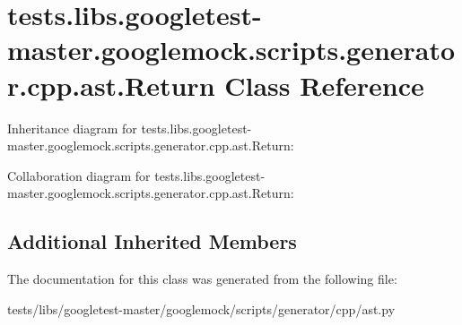 \hypertarget{classtests_1_1libs_1_1googletest-master_1_1googlemock_1_1scripts_1_1generator_1_1cpp_1_1ast_1_1Return}{}\section{tests.\+libs.\+googletest-\/master.googlemock.\+scripts.\+generator.\+cpp.\+ast.\+Return Class Reference}
\label{classtests_1_1libs_1_1googletest-master_1_1googlemock_1_1scripts_1_1generator_1_1cpp_1_1ast_1_1Return}


Inheritance diagram for tests.\+libs.\+googletest-\/master.googlemock.\+scripts.\+generator.\+cpp.\+ast.\+Return\+:


Collaboration diagram for tests.\+libs.\+googletest-\/master.googlemock.\+scripts.\+generator.\+cpp.\+ast.\+Return\+:
\subsection*{Additional Inherited Members}


The documentation for this class was generated from the following file\+:\begin{DoxyCompactItemize}
\item 
tests/libs/googletest-\/master/googlemock/scripts/generator/cpp/ast.\+py\end{DoxyCompactItemize}
